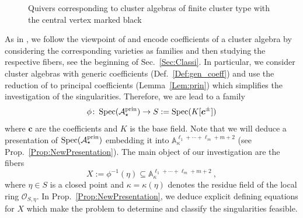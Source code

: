 \documentclass[letter,11pt]{amsart}
\renewcommand{\AA}{\ensuremath{\mathbb{A}}}
\newcommand{\KK}{\ensuremath{K}} %
\DeclareMathOperator{\Spec}{Spec}
\newcommand{\prin}{{\rm prin}}
\newcommand{\cA}{\mathcal{A}}
\renewcommand{\c}{{\boldsymbol{c}}}
\theoremstyle{theorem}
\theoremstyle{definition}
\newcommand{\len}{\ell}
\numberwithin{equation}{section}
\begin{document}
\begin{figure}[h!]
{
	}
	\caption{Quivers corresponding to cluster algebras of finite cluster type with the central vertex marked black}
	\label{Fig:ADE}
\end{figure}

As in \cite{BFMS25}, we follow the viewpoint of 
\cite{BFMN_degen} 
and encode coefficients of a cluster algebra
by considering the corresponding varieties as families and then studying the respective fibers,
see the beginning of Sec.~\ref{Sec:Classi}.
In particular, we consider cluster algebras with generic coefficients (Def.~\ref{Def:gen_coeff}) and use the reduction of \cite{BFMS25} to principal coefficients (Lemma~\ref{Lem:prin}) which simplifies the investigation of the singularities.
Therefore, 
we are lead to a family 
\[ 
	\phi \colon \Spec(\cA_\star^\prin) \to  S := \Spec(\KK [\c^\pm] ) 
\]
where $ \c $ are the coefficients and $ \KK $ is the base field.
Note that we will deduce a presentation of $ \Spec(\cA_\star^\prin) $ embedding it into $ \AA_\kappa^{\len_1+\cdots + \len_m+m+2} $
(see Prop.~\ref{Prop:NewPresentation}). 
The main object of our investigation are the fibers
\[  
	X := \phi^{-1} (\eta) 
	\subseteq \AA_\kappa^{\len_1+\cdots + \len_m+m+2} 
\ ,
\] 
where $ \eta \in S $ is a closed point and $ \kappa = \kappa (\eta ) $ denotes the residue field of the local ring $ \mathcal{O}_{S,\eta} $.
In Prop.~\ref{Prop:NewPresentation}, we deduce explicit defining equations for $ X $ which make the problem to determine and classify the singularities feasible. 
\end{document}

